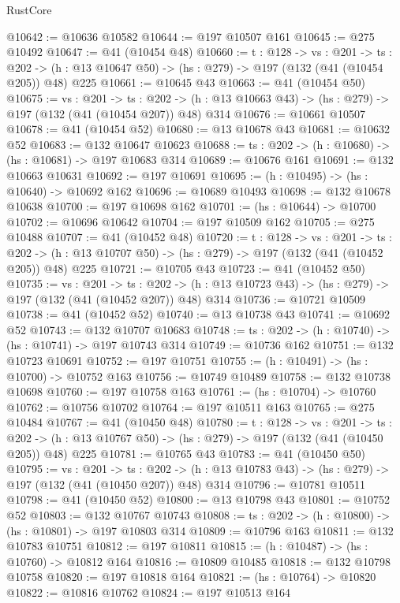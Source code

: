 \begin{lexlean}{RustCore}
\begin{coremodule}
@10642 := @10636 @10582
@10644 := @197 @10507 @161
@10645 := @275 @10492
@10647 := @41 (@10454 @48)
@10660 := {t : @128} ->
  {vs : @201} ->
  {ts : @202} -> (h : @13 @10647 @50) -> (hs : @279) -> @197 (@132 (@41 (@10454 @205)) @48) @225
@10661 := @10645 @43
@10663 := @41 (@10454 @50)
@10675 := {vs : @201} ->
  {ts : @202} -> (h : @13 @10663 @43) -> (hs : @279) -> @197 (@132 (@41 (@10454 @207)) @48) @314
@10676 := @10661 @10507
@10678 := @41 (@10454 @52)
@10680 := @13 @10678 @43
@10681 := @10632 @52
@10683 := @132 @10647 @10623
@10688 := {ts : @202} -> (h : @10680) -> (hs : @10681) -> @197 @10683 @314
@10689 := @10676 @161
@10691 := @132 @10663 @10631
@10692 := @197 @10691
@10695 := (h : @10495) -> (hs : @10640) -> @10692 @162
@10696 := @10689 @10493
@10698 := @132 @10678 @10638
@10700 := @197 @10698 @162
@10701 := (hs : @10644) -> @10700
@10702 := @10696 @10642
@10704 := @197 @10509 @162
@10705 := @275 @10488
@10707 := @41 (@10452 @48)
@10720 := {t : @128} ->
  {vs : @201} ->
  {ts : @202} -> (h : @13 @10707 @50) -> (hs : @279) -> @197 (@132 (@41 (@10452 @205)) @48) @225
@10721 := @10705 @43
@10723 := @41 (@10452 @50)
@10735 := {vs : @201} ->
  {ts : @202} -> (h : @13 @10723 @43) -> (hs : @279) -> @197 (@132 (@41 (@10452 @207)) @48) @314
@10736 := @10721 @10509
@10738 := @41 (@10452 @52)
@10740 := @13 @10738 @43
@10741 := @10692 @52
@10743 := @132 @10707 @10683
@10748 := {ts : @202} -> (h : @10740) -> (hs : @10741) -> @197 @10743 @314
@10749 := @10736 @162
@10751 := @132 @10723 @10691
@10752 := @197 @10751
@10755 := (h : @10491) -> (hs : @10700) -> @10752 @163
@10756 := @10749 @10489
@10758 := @132 @10738 @10698
@10760 := @197 @10758 @163
@10761 := (hs : @10704) -> @10760
@10762 := @10756 @10702
@10764 := @197 @10511 @163
@10765 := @275 @10484
@10767 := @41 (@10450 @48)
@10780 := {t : @128} ->
  {vs : @201} ->
  {ts : @202} -> (h : @13 @10767 @50) -> (hs : @279) -> @197 (@132 (@41 (@10450 @205)) @48) @225
@10781 := @10765 @43
@10783 := @41 (@10450 @50)
@10795 := {vs : @201} ->
  {ts : @202} -> (h : @13 @10783 @43) -> (hs : @279) -> @197 (@132 (@41 (@10450 @207)) @48) @314
@10796 := @10781 @10511
@10798 := @41 (@10450 @52)
@10800 := @13 @10798 @43
@10801 := @10752 @52
@10803 := @132 @10767 @10743
@10808 := {ts : @202} -> (h : @10800) -> (hs : @10801) -> @197 @10803 @314
@10809 := @10796 @163
@10811 := @132 @10783 @10751
@10812 := @197 @10811
@10815 := (h : @10487) -> (hs : @10760) -> @10812 @164
@10816 := @10809 @10485
@10818 := @132 @10798 @10758
@10820 := @197 @10818 @164
@10821 := (hs : @10764) -> @10820
@10822 := @10816 @10762
@10824 := @197 @10513 @164

\end{coremodule}
\end{lexlean}
